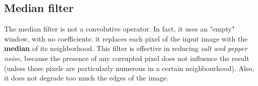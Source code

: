 \subsection{Median filter}
The median filter is not a convolutive operator. In fact, it uses an "empty" window, with no coefficients: it replaces each pixel of the input image with the \textbf{median} of its neighborhood. This filter is effective in reducing \textit{salt and pepper noise}, because the presence of any corrupted pixel does not influence the result (unless these pixels are particularly numerous in a certain neighbourhood). Also, it does not degrade too much the edges of the image.

